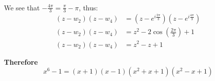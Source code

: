 \documentclass[a4paper, 8pt]{extarticle}
\begin{document}
\begin{examplebox}[Determine all solutions to $z^6 -1 = 0$ and factor $x^6-1$ as a product of linear and quadratic factors]
\begin{minipage}{0.49\textwidth}
\begin{align*}
        \end{align*}
    \end{minipage}
    \begin{minipage}{0.5\textwidth}
        We see that $-\frac{4\pi}{3} = \frac{\pi}{3} - \pi$, thus:
        \begin{align*}
            (z-w_2)(z-w_4) & = (z - e^{i\frac{2\pi}{3}})(z - e^{i\frac{4\pi}{3}}) \\
            (z-w_2)(z-w_4) & = z^2 - 2\cos\left(\frac{2\pi}{3}\right) + 1         \\
            (z-w_2)(z-w_4) & = z^2 - z + 1
        \end{align*}
    \end{minipage}
    \textbf{Therefore}
    $$x^6 -1 = (x+1)(x-1)(x^2 + x + 1)(x^2 - x + 1)$$
\end{examplebox}
\end{document}
